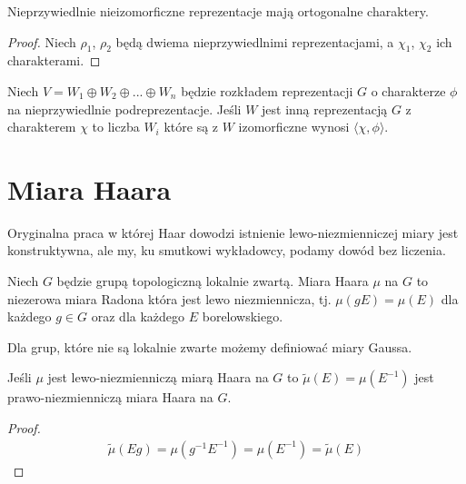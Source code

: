 \begin{lemma}{}{}
  Nieprzywiedlnie nieizomorficzne reprezentacje mają ortogonalne charaktery.
\end{lemma}

\begin{proof}
  Niech $\rho_1$, $\rho_2$ będą dwiema nieprzywiedlnimi reprezentacjami, a $\chi_1$, $\chi_2$ ich charakterami.
\end{proof}

\begin{theorem}{}{}
  Niech $V=W_1\oplus W_2\oplus ... \oplus W_n$ będzie rozkładem reprezentacji $G$ o charakterze $\phi$ na nieprzywiedlnie podreprezentacje. Jeśli $W$ jest inną reprezentacją $G$ z charakterem $\chi$ to liczba $W_i$ które są z $W$ izomorficzne wynosi $\langle \chi, \phi\rangle$.
\end{theorem}



%



\section{Miara Haara}

Oryginalna praca w której Haar dowodzi istnienie lewo-niezmienniczej miary jest konstruktywna, ale my, ku smutkowi wykładowcy, podamy dowód bez liczenia.

\begin{definition}{}{}
  Niech $G$ będzie grupą topologiczną lokalnie zwartą. Miara Haara $\mu$ na $G$ to niezerowa miara Radona która jest lewo niezmiennicza, tj. $\mu(gE)=\mu(E)$ dla każdego $g\in G$ oraz dla każdego $E$ borelowskiego.
\end{definition}

Dla grup, które nie są lokalnie zwarte możemy definiować miary Gaussa.

\begin{lemma}{}{}
  Jeśli $\mu$ jest lewo-niezmienniczą miarą Haara na $G$ to $\tilde{\mu}(E)=\mu(E^{-1})$ jest prawo-niezmienniczą miara Haara na $G$.
\end{lemma}

\begin{proof}
  \begin{align*}
    \tilde{\mu}(Eg)=\mu(g^{-1}E^{-1})=\mu(E^{-1})=\tilde{\mu}(E)
  \end{align*}
\end{proof}

